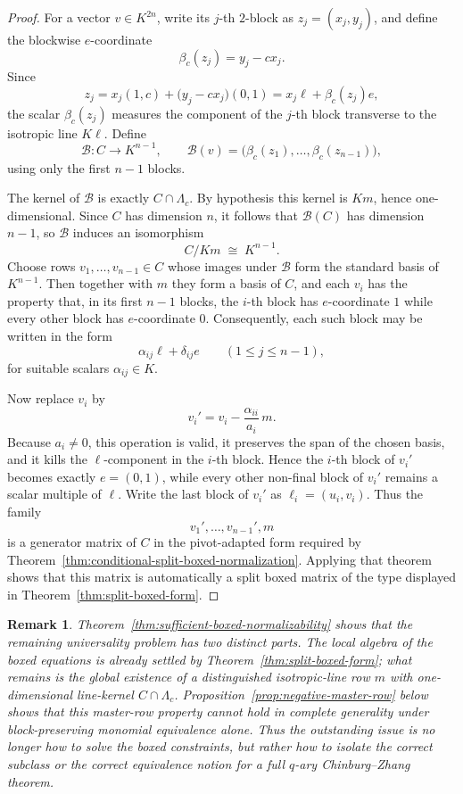 \documentclass[12pt]{article}
\newtheorem{remark}[theorem]{Remark}
\begin{document}
\begin{proof}
For a vector \(v\in K^{2n}\), write its \(j\)-th \(2\)-block as \(z_j=(x_j,y_j)\), and define the blockwise \(e\)-coordinate
\[
\beta_c(z_j)=y_j-cx_j.
\]
Since
\[
z_j=x_j(1,c)+\bigl(y_j-cx_j\bigr)(0,1)=x_j\ell+\beta_c(z_j)e,
\]
the scalar \(\beta_c(z_j)\) measures the component of the \(j\)-th block transverse to the isotropic line \(K\ell\). Define
\[
\mathcal B:C\longrightarrow K^{n-1},
\qquad
\mathcal B(v)=\bigl(\beta_c(z_1),\dots,\beta_c(z_{n-1})\bigr),
\]
using only the first \(n-1\) blocks.

The kernel of \(\mathcal B\) is exactly \(C\cap\Lambda_c\). By hypothesis this kernel is \(Km\), hence one-dimensional. Since \(C\) has dimension \(n\), it follows that \(\mathcal B(C)\) has dimension \(n-1\), so \(\mathcal B\) induces an isomorphism
\[
C/Km \;\cong\; K^{n-1}.
\]
Choose rows \(v_1,\dots,v_{n-1}\in C\) whose images under \(\mathcal B\) form the standard basis of \(K^{n-1}\). Then together with \(m\) they form a basis of \(C\), and each \(v_i\) has the property that, in its first \(n-1\) blocks, the \(i\)-th block has \(e\)-coordinate \(1\) while every other block has \(e\)-coordinate \(0\). Consequently, each such block may be written in the form
\[
\alpha_{ij}\ell+\delta_{ij}e
\qquad (1\le j\le n-1),
\]
for suitable scalars \(\alpha_{ij}\in K\).

Now replace \(v_i\) by
\[
v_i' = v_i - \frac{\alpha_{ii}}{a_i}\,m.
\]
Because \(a_i\neq 0\), this operation is valid, it preserves the span of the chosen basis, and it kills the \(\ell\)-component in the \(i\)-th block. Hence the \(i\)-th block of \(v_i'\) becomes exactly \(e=(0,1)\), while every other non-final block of \(v_i'\) remains a scalar multiple of \(\ell\). Write the last block of \(v_i'\) as \(\ell_i=(u_i,v_i)\). Thus the family
\[
v_1',\dots,v_{n-1}',m
\]
is a generator matrix of \(C\) in the pivot-adapted form required by Theorem~\ref{thm:conditional-split-boxed-normalization}. Applying that theorem shows that this matrix is automatically a split boxed matrix of the type displayed in Theorem~\ref{thm:split-boxed-form}.
\end{proof}

\begin{remark}
\rm
Theorem~\ref{thm:sufficient-boxed-normalizability} shows that the remaining universality problem has two distinct parts. The local algebra of the boxed equations is already settled by Theorem~\ref{thm:split-boxed-form}; what remains is the global existence of a distinguished isotropic-line row \(m\) with one-dimensional line-kernel \(C\cap\Lambda_c\). Proposition~\ref{prop:negative-master-row} below shows that this master-row property cannot hold in complete generality under block-preserving monomial equivalence alone. Thus the outstanding issue is no longer how to solve the boxed constraints, but rather how to isolate the correct subclass or the correct equivalence notion for a full \(q\)-ary Chinburg--Zhang theorem.
\end{remark}
\end{document}
